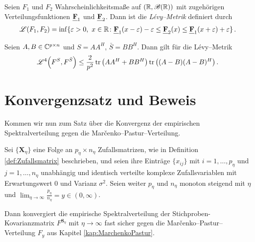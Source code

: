 \documentclass[../Bachelor_LennartKoliwer.tex]{subfiles}
\begin{document}
\begin{definition}\label{def:lévy}
    Seien $F_1$ und $F_2$ Wahrscheinlichkeitsmaße auf $(\mathbb{R},\mathscr{B}(\mathbb{R}))$ mit zugehörigen Verteilungsfunktionen $\textbf{\emph{F}}_1$ und $\textbf{\emph{F}}_2$. 
    Dann ist die \emph{Lévy--Metrik} definiert durch
    \begin{align*}
        \mathscr{L}(F_1,F_2)= \inf\{\varepsilon>0 ,\ x\in\mathbb{R} \colon \textbf{\emph{F}}_1(x-\varepsilon)-\varepsilon\leq \textbf{\emph{F}}_2(x) \leq \textbf{\emph{F}}_1(x+\varepsilon)+\varepsilon\}\,.
    \end{align*} 
\end{definition}


\begin{lemma}\label{lem:L4}
    Seien $A,B\in\mathbb{C}^{p\times n}$ und $S=AA^H$, $\bar{S}=BB^H$. 
    Dann gilt für die Lévy--Metrik
    \begin{align*}
        \mathscr{L}^4\lr{F^S,F^{\bar{S}}}\leq \frac{2}{p^2}\tr\lr{AA^H+BB^H}\tr{\lr{(A-B)(A-B)^{H}}}\,.
    \end{align*}
\end{lemma}


























\section{Konvergenzsatz und Beweis}

Kommen wir nun zum Satz über die Konvergenz der empirischen Spektralverteilung gegen die Mar\v{c}enko--Pastur--Verteilung.

\begin{theorem}\label{theo:MPVert}
    Sei $\{\bm{X}_\eta\}$ eine Folge an $p_\eta\times n_\eta$ Zufallsmatrizen, wie in Definition \ref{def:Zufallsmatrix} beschrieben, und seien ihre Einträge $\{x_{ij}\}$ mit $i=1,\dots,p_\eta$ und $j=1,\dots,n_\eta$ unabhängig und identisch verteilte komplexe Zufallsvariablen mit Erwartungswert $0$ und Varianz $\sigma^2$. 
    Seien weiter $p_\eta$ und $n_\eta$ monoton steigend mit $\eta$ und $\displaystyle\lim_{\eta\to\infty}\frac{p_\eta}{n_\eta}=y \in(0,\infty)$.
    
    Dann konvergiert die empirische Spektralverteilung der Stichproben-Kovarianzmatrix $F^{\bm{S}_\eta}$ mit $\eta\to\infty$ fast sicher gegen die Mar\v{c}enko--Pastur--Verteilung $F_y$ aus Kapitel \ref{kap:MarchenkoPastur}.
\end{theorem}
\end{document}
